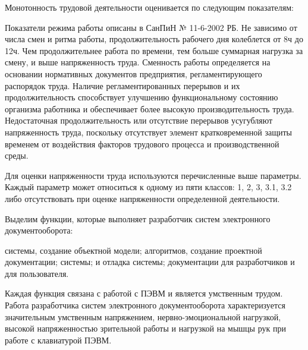 \documentclass[14pt,a4paper]{reportmod}
\begin{document}
Монотонность трудовой деятельности оценивается по следующим показателям:
\begin{gostitemize}
\end{gostitemize}
        Показатели режима работы описаны в СанПиН № 11-6-2002 РБ. Не зависимо от числа смен и ритма работы, продолжительность рабочего дня колеблется от 8ч до 12ч. Чем продолжительнее работа по времени, тем больше суммарная нагрузка за смену, и выше напряженность труда. Сменность работы определяется на основании нормативных документов предприятия, регламентирующего распорядок труда. Наличие регламентированных перерывов и их продолжительность способствует улучшению функциональному состоянию организма работника и обеспечивает более высокую производительность труда. Недостаточная продолжительность или отсутствие перерывов усугубляют напряженность труда, поскольку отсутствует элемент кратковременной защиты временем от воздействия факторов трудового процесса и производственной среды.


Для оценки напряженности труда используются перечисленные выше параметры. Каждый параметр может относиться к одному из пяти классов: 1, 2, 3, 3.1, 3.2 либо отсутствовать при оценке напряженности определенной деятельности.


Выделим функции, которые выполняет разработчик систем электронного документооборота:
\begin{enumerate}
   системы, создание объектной модели;
   алгоритмов, создание проектной документации;
   системы;
   и отладка системы;
   документации для разработчиков и для пользователя.
\end{enumerate}
Каждая  функция связана с работой с ПЭВМ и является умственным трудом. Работа разработчика систем электронного документооборота характеризуется значительным умственным напряжением, нервно-эмоциональной нагрузкой, высокой напряженностью зрительной работы и нагрузкой на мышцы рук при работе с клавиатурой ПЭВМ.
\end{document}
